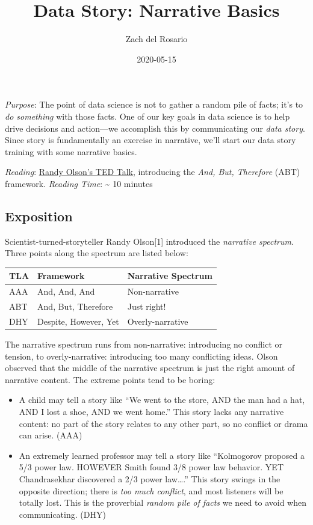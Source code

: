 \documentclass[
]{article}
\title{Data Story: Narrative Basics}
\author{Zach del Rosario}
\date{2020-05-15}
\providecommand{\tightlist}{%
  \setlength{\itemsep}{0pt}\setlength{\parskip}{0pt}}
\begin{document}
\maketitle

\emph{Purpose}: The point of data science is not to gather a random pile
of facts; it's to \emph{do something} with those facts. One of our key
goals in data science is to help drive decisions and action---we
accomplish this by communicating our \emph{data story}. Since story is
fundamentally an exercise in narrative, we'll start our data story
training with some narrative basics.

\emph{Reading}: \href{https://www.youtube.com/watch?v=ERB7ITvabA4}{Randy
Olson's TED Talk}, introducing the \emph{And, But, Therefore} (ABT)
framework. \emph{Reading Time}: \textasciitilde{} 10 minutes

\hypertarget{exposition}{%
\subsection{Exposition}\label{exposition}}

Scientist-turned-storyteller Randy Olson{[}1{]} introduced the
\emph{narrative spectrum}. Three points along the spectrum are listed
below:

\begin{longtable}[]{@{}lll@{}}
\toprule
TLA & Framework & Narrative Spectrum\tabularnewline
\midrule
\endhead
AAA & And, And, And & Non-narrative\tabularnewline
ABT & And, But, Therefore & Just right!\tabularnewline
DHY & Despite, However, Yet & Overly-narrative\tabularnewline
\bottomrule
\end{longtable}

The narrative spectrum runs from non-narrative: introducing no conflict
or tension, to overly-narrative: introducing too many conflicting ideas.
Olson observed that the middle of the narrative spectrum is just the
right amount of narrative content. The extreme points tend to be boring:

\begin{itemize}
\tightlist
\item
  A child may tell a story like ``We went to the store, AND the man had
  a hat, AND I lost a shoe, AND we went home.'' This story lacks any
  narrative content: no part of the story relates to any other part, so
  no conflict or drama can arise. (AAA)
\item
  An extremely learned professor may tell a story like ``Kolmogorov
  proposed a 5/3 power law. HOWEVER Smith found 3/8 power law behavior.
  YET Chandrasekhar discovered a 2/3 power law\ldots.'' This story
  swings in the opposite direction; there is \emph{too much conflict},
  and most listeners will be totally lost. This is the proverbial
  \emph{random pile of facts} we need to avoid when communicating. (DHY)
\end{itemize}
\end{document}
